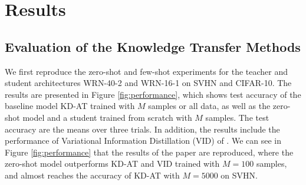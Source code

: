 \section{Results} 

\subsection{Evaluation of the Knowledge Transfer Methods}
We first reproduce the zero-shot and few-shot experiments for the teacher and student architectures WRN-40-2 and WRN-16-1 on SVHN and CIFAR-10. The results are presented in Figure \ref{fig:performance}, which shows test accuracy of the baseline model KD-AT trained with $M$ samples or all data, as well as the zero-shot model and a student trained from scratch with $M$ samples. The test accuracy are the means over three trials. In addition, the results include the performance of Variational Information Distillation (VID) of \cite{Ahn2019VariationalID}. We can see in Figure \ref{fig:performance} that the results of the paper are reproduced, where the zero-shot model outperforms KD-AT and VID trained with $M=100$ samples, and almost reaches the accuracy of KD-AT with $M=5000$ on SVHN.

